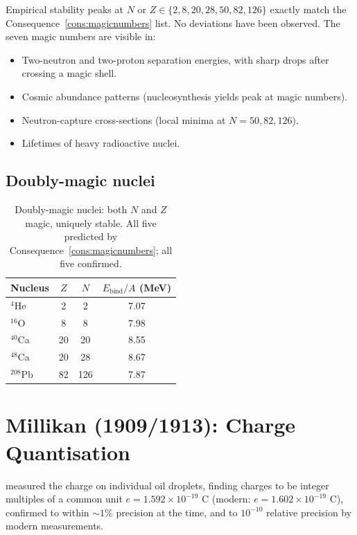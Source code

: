 Empirical stability peaks at $N$ or $Z\in\{2,8,20,28,50,82,126\}$ exactly
match the Consequence~\ref{cons:magicnumbers} list.  No deviations have
been observed.  The seven magic numbers are visible in:
\begin{itemize}
  \item Two-neutron and two-proton separation energies, with sharp drops
    after crossing a magic shell.
  \item Cosmic abundance patterns (nucleosynthesis yields peak at magic
    numbers).
  \item Neutron-capture cross-sections (local minima at $N=50,82,126$).
  \item Lifetimes of heavy radioactive nuclei.
\end{itemize}

\subsection{Doubly-magic nuclei}

\begin{table}[htbp]
\centering
\caption{Doubly-magic nuclei: both $N$ and $Z$ magic, uniquely stable.
All five predicted by Consequence~\ref{cons:magicnumbers}; all five confirmed.}
\label{tab:doublymagic}
\begin{tabular}{@{}lccc@{}}
\toprule
Nucleus & $Z$ & $N$ & $E_{\text{bind}}/A$ (MeV) \\
\midrule
$^{4}$He   & 2  & 2   & 7.07 \\
$^{16}$O   & 8  & 8   & 7.98 \\
$^{40}$Ca  & 20 & 20  & 8.55 \\
$^{48}$Ca  & 20 & 28  & 8.67 \\
$^{208}$Pb & 82 & 126 & 7.87 \\
\bottomrule
\end{tabular}
\end{table}

\section{Millikan (1909/1913): Charge Quantisation}
\label{sec:millikan-ch25}

\citet{millikan1913} measured the charge on individual oil droplets, finding
charges to be integer multiples of a common unit
$e=1.592\times 10^{-19}$ C (modern: $e=1.602\times 10^{-19}$ C), confirmed
to within $\sim 1\%$ precision at the time, and to
$10^{-10}$ relative precision by modern measurements.

